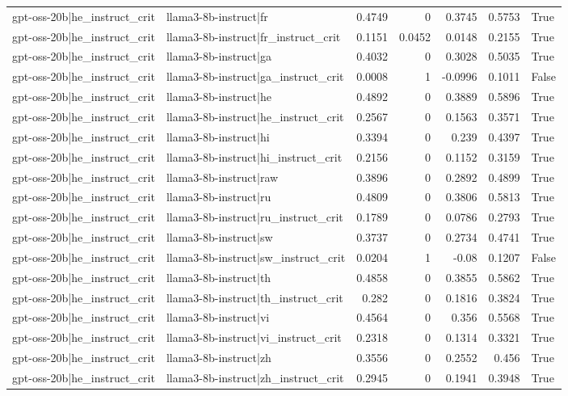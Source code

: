 \begin{table}
\begin{tabular}{l l r r r r l}
gpt-oss-20b|he_instruct_crit & llama3-8b-instruct|fr & 0.4749 & 0 & 0.3745 & 0.5753 & True \\
gpt-oss-20b|he_instruct_crit & llama3-8b-instruct|fr_instruct_crit & 0.1151 & 0.0452 & 0.0148 & 0.2155 & True \\
gpt-oss-20b|he_instruct_crit & llama3-8b-instruct|ga & 0.4032 & 0 & 0.3028 & 0.5035 & True \\
gpt-oss-20b|he_instruct_crit & llama3-8b-instruct|ga_instruct_crit & 0.0008 & 1 & -0.0996 & 0.1011 & False \\
gpt-oss-20b|he_instruct_crit & llama3-8b-instruct|he & 0.4892 & 0 & 0.3889 & 0.5896 & True \\
gpt-oss-20b|he_instruct_crit & llama3-8b-instruct|he_instruct_crit & 0.2567 & 0 & 0.1563 & 0.3571 & True \\
gpt-oss-20b|he_instruct_crit & llama3-8b-instruct|hi & 0.3394 & 0 & 0.239 & 0.4397 & True \\
gpt-oss-20b|he_instruct_crit & llama3-8b-instruct|hi_instruct_crit & 0.2156 & 0 & 0.1152 & 0.3159 & True \\
gpt-oss-20b|he_instruct_crit & llama3-8b-instruct|raw & 0.3896 & 0 & 0.2892 & 0.4899 & True \\
gpt-oss-20b|he_instruct_crit & llama3-8b-instruct|ru & 0.4809 & 0 & 0.3806 & 0.5813 & True \\
gpt-oss-20b|he_instruct_crit & llama3-8b-instruct|ru_instruct_crit & 0.1789 & 0 & 0.0786 & 0.2793 & True \\
gpt-oss-20b|he_instruct_crit & llama3-8b-instruct|sw & 0.3737 & 0 & 0.2734 & 0.4741 & True \\
gpt-oss-20b|he_instruct_crit & llama3-8b-instruct|sw_instruct_crit & 0.0204 & 1 & -0.08 & 0.1207 & False \\
gpt-oss-20b|he_instruct_crit & llama3-8b-instruct|th & 0.4858 & 0 & 0.3855 & 0.5862 & True \\
gpt-oss-20b|he_instruct_crit & llama3-8b-instruct|th_instruct_crit & 0.282 & 0 & 0.1816 & 0.3824 & True \\
gpt-oss-20b|he_instruct_crit & llama3-8b-instruct|vi & 0.4564 & 0 & 0.356 & 0.5568 & True \\
gpt-oss-20b|he_instruct_crit & llama3-8b-instruct|vi_instruct_crit & 0.2318 & 0 & 0.1314 & 0.3321 & True \\
gpt-oss-20b|he_instruct_crit & llama3-8b-instruct|zh & 0.3556 & 0 & 0.2552 & 0.456 & True \\
gpt-oss-20b|he_instruct_crit & llama3-8b-instruct|zh_instruct_crit & 0.2945 & 0 & 0.1941 & 0.3948 & True \\

\end{tabular}
\end{table}
